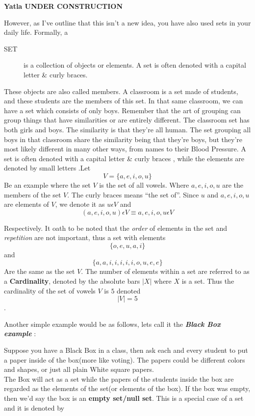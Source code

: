 \documentclass[
  letterpaper,
  DIV=11,
  numbers=noendperiod]{scrreprt}
\begin{document}
\textbf{Yatla \textbar{} UNDER CONSTRUCTION}

However, as I've outline that this isn't a new idea, you have also used
sets in your daily life. Formally, a

\begin{description}
\item[SET]
is a collection of objects or elements. A set is often denoted with a
capital letter \& curly braces.
\end{description}

These objects are also called members. A classroom is a set made of
students, and these students are the members of this set. In that same
classroom, we can have a set which consists of only boys. Remember that
the art of grouping can group things that have similarities or are
entirely different. The classroom set has both girls and boys. The
similarity is that they're all human. The set grouping all boys in that
classroom share the similarity being that they're boys, but they're most
likely different in many other ways, from names to their Blood Pressure.
A set is often denoted with a capital letter \& curly braces , while the
elements are denoted by small letters .Let \[
V = \{𝑎,𝑒,𝑖,𝑜,𝑢\}
\] Be an example where the set \(V\) is the set of all vowels. Where
\(𝑎,𝑒,𝑖,𝑜,𝑢\) are the members of the set \(V\). The curly braces means
``the set of''. Since \(u\) and \(a, 𝑒,𝑖, 𝑜,𝑢\) are elements of \(V\),
we denote it as \(u𝜖V\) and \[(𝑎,𝑒,𝑖,𝑜,𝑢)𝜖V ≡ 𝑎,𝑒,𝑖,𝑜,𝑢𝜖V\]

Respectively. It oath to be noted that the \emph{order} of elements in
the set and \emph{repetition} are not important, thus a set with
elements \[\{𝑜, 𝑒, 𝑢,𝑎,𝑖\}\] and \[\{𝑎,𝑎,𝑖,𝑖,𝑖,𝑖,𝑖,𝑜,𝑢,𝑒,𝑒\} \] Are the
same as the set \(V\). The number of elements within a set are referred
to as a \textbf{Cardinality}, denoted by the absolute bars \(|𝑋|\) where
\(X\) is a set. Thus the cardinality of the set of vowels \(𝑉\) is \(5\)
denoted \[|V| = 5\].

Another simple example would be as follows, lets call it the
\textbf{\emph{Black Box example}} :

Suppose you have a Black Box in a class, then ask each and every student
to put a paper inside of the box(more like voting). The papers could be
different colors and shapes, or just all plain White square papers.\\
The Box will act as a set while the papers of the students inside the
box are regarded as the elements of the set(or elements of the box). If
the box was empty, then we'd say the box is an \textbf{empty set/null
set}. This is a special case of a set and it is denoted by
\end{document}
